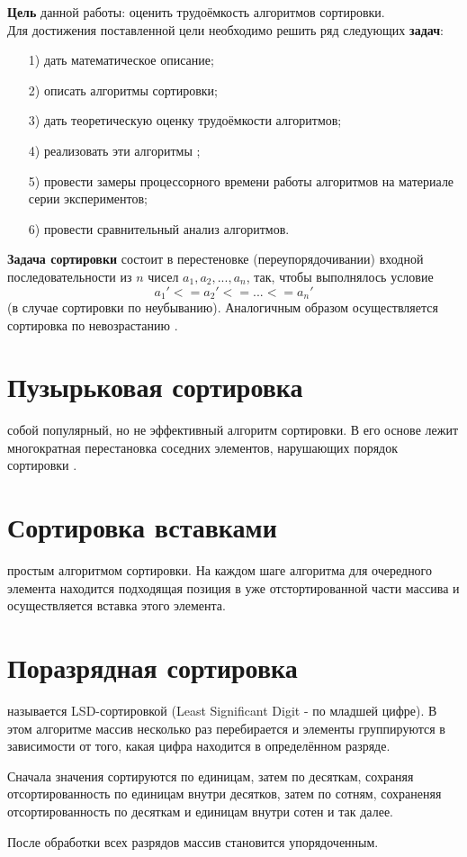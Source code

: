 \textbf{Цель} данной работы: оценить трудоёмкость алгоритмов сортировки.\\

Для достижения поставленной цели необходимо решить ряд следующих \textbf{задач}:
\begin{enumerate}
\item[1)] дать математическое описание;
\item[2)] описать алгоритмы сортировки;
\item[3)] дать теоретическую оценку трудоёмкости алгоритмов;
\item[4)] реализовать эти алгоритмы ;
\item[5)] провести замеры процессорного времени работы алгоритмов на материале серии экспериментов;
\item[6)] провести сравнительный анализ алгоритмов.
\end{enumerate}

\textbf{Задача сортировки} состоит в перестеновке (переупорядочивании) входной последовательности из $n$ чисел ${a_1, a_2, ..., a_n}$, так, чтобы выполнялось условие
\begin{equation}
	a_1' <= a_2' <= ... <= a_n'
\end{equation} (в случае сортировки по неубыванию). Аналогичным образом осуществляется сортировка по невозрастанию \cite{Kormen}.

\section{Пузырьковая сортировка}
 собой популярный, но не эффективный алгоритм сортировки. В его основе лежит многократная перестановка соседних элементов, нарушающих порядок сортировки \cite{Kormen}.

\section{Сортировка вставками}
 простым алгоритмом сортировки. На каждом шаге алгоритма для очередного элемента находится подходящая позиция в уже отстортированной части массива и осуществляется вставка этого элемента. 

\section{Поразрядная сортировка}
 называется LSD-сортировкой (Least Significant Digit - по младшей цифре). В этом алгоритме массив несколько раз перебирается и элементы группируются в зависимости от того, какая цифра находится в определённом разряде. 

Сначала значения сортируются по единицам, затем по десяткам, сохраняя отсортированность по единицам внутри десятков, затем по сотням, сохраненяя отсортированность по десяткам и единицам внутри сотен и так далее.

После обработки всех разрядов массив становится упорядоченным.  